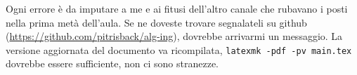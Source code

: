 Ogni errore è da imputare a me e ai fitusi dell'altro canale che rubavano i posti nella prima metà dell'aula. Se ne doveste trovare segnalateli su github (\url{https://github.com/pitrisback/alg-ing}), dovrebbe arrivarmi un messaggio. La versione aggiornata del documento va ricompilata, \texttt{latexmk -pdf -pv main.tex} dovrebbe essere sufficiente, non ci sono stranezze.
